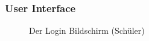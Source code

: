 \subsubsection{User Interface}
\begin{figure}[H]
	\centering
	\caption{Der Login Bildschirm (Schüler)}
	\label{Der Login Bildschirm}
\end{figure}
